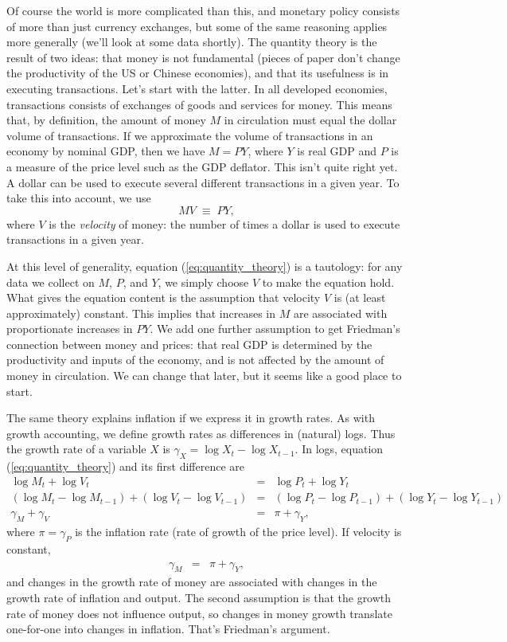 \documentclass[letterpaper,12pt]{article}
\begin{document}
Of course the world is more complicated than this, and monetary
policy consists of more than just currency exchanges, but some of
the same reasoning applies more generally (we'll look at some data
shortly). The quantity theory is the result of two ideas:  that
money is not fundamental (pieces of paper don't change the
productivity of the US or Chinese economies), and that its
usefulness is in executing transactions.  Let's start with the
latter. In all developed economies, transactions consists of
exchanges of goods and services for money. This means that, by
definition, the amount of money $M$ in circulation must equal the
dollar volume of transactions. If we approximate the volume of
transactions in an economy by nominal GDP, then we have
$M=PY$, where $Y$ is real GDP and $P$ is a measure of the
price level such as the GDP deflator. This isn't quite right yet. A
dollar can be used to execute several different transactions in a
given year.
To take this into account, we use
%
\begin{equation}
    M V  \;\equiv\;  P Y,
    \label{eq:quantity_theory}
\end{equation}
%
where $V$ is the \textit{velocity} of money: the number of times a
dollar is used to execute transactions in a given year.

At this level of generality,
equation (\ref{eq:quantity_theory}) is a tautology:
for any data we collect on $M$, $P$, and $Y$,
we simply choose $V$ to make the equation hold.
What gives the equation content is the
assumption that velocity $V$ is (at least approximately)
constant.  This implies that increases in $M$ are associated with
proportionate increases in $PY$.
We add one further assumption to get Friedman's connection between
money and prices:
that real GDP is determined by the productivity and inputs of the economy,
and is not affected by the amount of money in circulation.
We can change that later, but it seems like a good place to start.


The same theory explains inflation if we express it in growth rates.
As with growth accounting, we define growth rates as differences
in (natural) logs.
Thus the growth rate of a variable $X$ is
$ \gamma_X = \log X_t - \log X_{t-1}$.
In logs, equation (\ref{eq:quantity_theory}) and its first difference are
%
\begin{eqnarray*}
    \log M_t + \log V_t &=& \log P_t + \log Y_t \\
    (\log M_t - \log M_{t-1})  + (\log V_t - \log V_{t-1})
                 &=& (\log P_t - \log P_{t-1}) + (\log Y_t - \log Y_{t-1})\\
    \gamma_M  + \gamma_V &=&  \pi + \gamma_Y ,
\end{eqnarray*}
%
where $\pi = \gamma_P $ is the inflation rate
(rate of growth of the price level).
If velocity is constant,
\begin{eqnarray}
    \gamma_M   &=&  \pi + \gamma_Y ,
    \label{eq:quantity_theory-growth}
\end{eqnarray}
and changes in the growth rate of money are associated
with changes in the growth rate of inflation and output.
The second assumption is that the growth rate of money does not influence
output, so changes in money growth translate one-for-one
into changes in inflation.
That's Friedman's argument.
\end{document}
